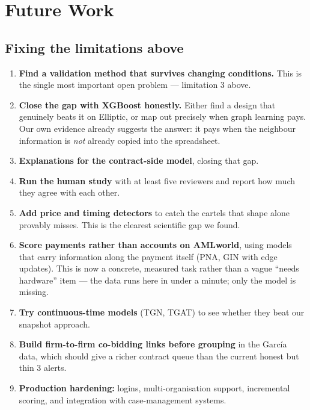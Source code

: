 \documentclass[11pt,a4paper]{article}
\begin{document}
\section{Future Work}
\label{sec:future}

\subsection{Fixing the limitations above}

\begin{enumerate}
  \item \textbf{Find a validation method that survives changing conditions.} This
        is the single most important open problem --- limitation 3 above.
  \item \textbf{Close the gap with XGBoost honestly.} Either find a design that
        genuinely beats it on Elliptic, or map out precisely when graph learning
        pays. Our own evidence already suggests the answer: it pays when the
        neighbour information is \emph{not} already copied into the spreadsheet.
  \item \textbf{Explanations for the contract-side model}, closing that gap.
  \item \textbf{Run the human study} with at least five reviewers and report how
        much they agree with each other.
  \item \textbf{Add price and timing detectors} to catch the cartels that shape
        alone provably misses. This is the clearest scientific gap we found.
  \item \textbf{Score payments rather than accounts on AMLworld}, using models
        that carry information along the payment itself (PNA, GIN with edge
        updates). This is now a concrete, measured task rather than a vague
        ``needs hardware'' item --- the data runs here in under a minute; only
        the model is missing.
  \item \textbf{Try continuous-time models} (TGN, TGAT) to see whether they beat
        our snapshot approach.
  \item \textbf{Build firm-to-firm co-bidding links before grouping} in the García
        data, which should give a richer contract queue than the current honest
        but thin 3 alerts.
  \item \textbf{Production hardening:} logins, multi-organisation support,
        incremental scoring, and integration with case-management systems.
\end{enumerate}
\end{document}
